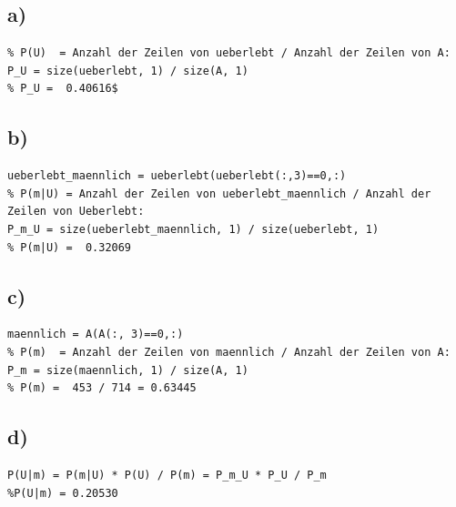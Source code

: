 \documentclass{article}
\begin{document}
\subsection*{a)}

\begin{verbatim}
% P(U)  = Anzahl der Zeilen von ueberlebt / Anzahl der Zeilen von A:
P_U = size(ueberlebt, 1) / size(A, 1)
% P_U =  0.40616$
\end{verbatim}

\subsection*{b)}

\begin{verbatim}
ueberlebt_maennlich = ueberlebt(ueberlebt(:,3)==0,:)
% P(m|U) = Anzahl der Zeilen von ueberlebt_maennlich / Anzahl der Zeilen von Ueberlebt:
P_m_U = size(ueberlebt_maennlich, 1) / size(ueberlebt, 1)
% P(m|U) =  0.32069
\end{verbatim}

\subsection*{c)}

\begin{verbatim}
maennlich = A(A(:, 3)==0,:)
% P(m)  = Anzahl der Zeilen von maennlich / Anzahl der Zeilen von A:
P_m = size(maennlich, 1) / size(A, 1)
% P(m) =  453 / 714 = 0.63445
\end{verbatim}

\subsection*{d)}

\begin{verbatim}
P(U|m) = P(m|U) * P(U) / P(m) = P_m_U * P_U / P_m
%P(U|m) = 0.20530
\end{verbatim}
\end{document}
